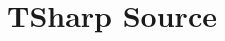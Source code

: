 \chapter{TSharp Source}
\hypertarget{md_source_2_r_e_a_d_m_e}{}\label{md_source_2_r_e_a_d_m_e}
\label{md_source_2_r_e_a_d_m_e_autotoc_md0}%
%
